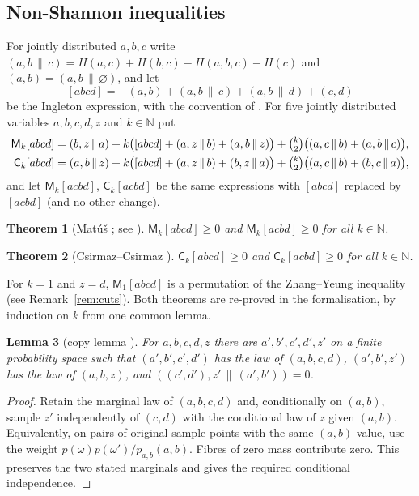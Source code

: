 \documentclass[11pt]{amsart}
\newtheorem{theorem}{Theorem}[section]
\newtheorem{lemma}[theorem]{Lemma}
\theoremstyle{definition}
\theoremstyle{remark}
\numberwithin{equation}{section}
\newcommand{\N}{\mathbb{N}}
\newcommand{\cmi}[3]{(#1,#2\,\|\,#3)}
\begin{document}
\subsection{Non-Shannon inequalities}\label{subsec:nonshannon}
For jointly distributed $a,b,c$ write $\cmi abc=H(a,c)+H(b,c)-H(a,b,c)-H(c)$ and
$(a,b)=\cmi ab\varnothing$, and let
\[
  [abcd]=-(a,b)+\cmi abc+\cmi abd+(c,d)
\]
be the Ingleton expression, with the convention of \cite[\S2]{CC}. For five jointly distributed variables $a,b,c,d,z$ and
$k\in\N$ put
\begin{align*}
\mathsf M_k[abcd]&=\cmi bza+k\bigl([abcd]+\cmi azb+\cmi abz\bigr)+\tbinom k2\bigl(\cmi acb+\cmi abc\bigr),\\
\mathsf C_k[abcd]&=\cmi abz+k\bigl([abcd]+\cmi azb+\cmi bza\bigr)+\tbinom k2\bigl(\cmi acb+\cmi bca\bigr),
\end{align*}
and let $\mathsf M_k[acbd]$, $\mathsf C_k[acbd]$ be the same expressions with $[abcd]$ replaced by
$[acbd]$ (and no other change).

\begin{theorem}[{Mat\'u\v{s} \cite{Mat07}; see \cite[Theorem~22]{CC}}]\label{thm:matus}
$\mathsf M_k[abcd]\ge0$ and $\mathsf M_k[acbd]\ge0$ for all $k\in\N$.
\end{theorem}

\begin{theorem}[{Csirmaz--Csirmaz \cite[(31)]{CC}}]\label{thm:companion}
$\mathsf C_k[abcd]\ge0$ and $\mathsf C_k[acbd]\ge0$ for all $k\in\N$.
\end{theorem}

For $k=1$ and $z=d$, $\mathsf M_1[abcd]$ is a permutation of the
Zhang--Yeung inequality \cite{ZY98} (see
Remark~\ref{rem:cuts}). Both theorems are re-proved in the formalisation, by induction on $k$ from
one common lemma.

\begin{lemma}[copy lemma \cite{ZY98,DFZ11}]\label{lem:copy}
For $a,b,c,d,z$ there are $a',b',c',d',z'$ on a finite probability space such that
$(a',b',c',d')$ has the law of $(a,b,c,d)$, $(a',b',z')$ has the law of $(a,b,z)$, and
$\cmi{(c',d')}{z'}{(a',b')}=0$.
\end{lemma}

\begin{proof}
Retain the marginal law of $(a,b,c,d)$ and, conditionally on $(a,b)$,
sample $z'$ independently of $(c,d)$ with the conditional law of $z$
given $(a,b)$. Equivalently, on pairs of original sample points with
the same $(a,b)$-value, use the weight $p(\omega)p(\omega')/p_{a,b}(a,b)$.
Fibres of zero mass contribute zero. This preserves the two stated
marginals and gives the required conditional independence.
\end{proof}
\end{document}
